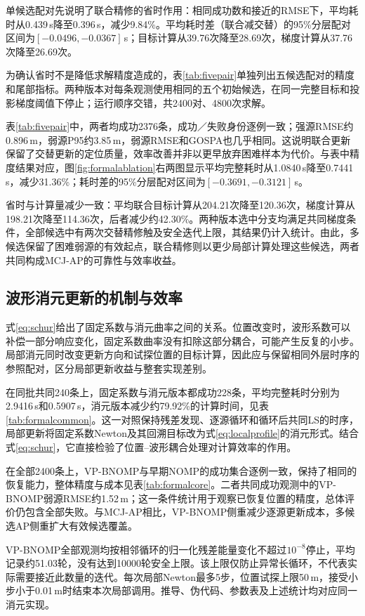 单候选配对先说明了联合精修的省时作用：相同成功数和接近的RMSE下，平均耗时从0.439\,s降至0.396\,s，减少9.84\%。平均耗时差（联合减交替）的95\%分层配对区间为$[-0.0496,-0.0367]$\,s；目标计算从39.76次降至28.69次，梯度计算从37.76次降至26.69次。

为确认省时不是降低求解精度造成的，表\ref{tab:fivepair}单独列出五候选配对的精度和尾部指标。两种版本对每条观测使用相同的五个初始候选，在同一完整目标和投影梯度阈值下停止；运行顺序交错，共2400对、4800次求解。

表\ref{tab:fivepair}中，两者均成功2376条，成功／失败身份逐例一致；强源RMSE约0.896\,m，弱源P95约3.85\,m，弱源RMSE和GOSPA也几乎相同。这说明联合更新保留了交替更新的定位质量，效率改善并非以更早放弃困难样本为代价。与表中精度结果对应，图\ref{fig:formalablation}右两图显示平均完整耗时从1.0840\,s降至0.7441\,s，减少31.36\%；耗时差的95\%分层配对区间为$[-0.3691,-0.3121]$\,s。

省时与计算量减少一致：平均联合目标计算从204.21次降至120.36次，梯度计算从198.21次降至114.36次，后者减少约42.30\%。两种版本选中分支均满足共同梯度条件，全部候选中有两次交替精修触及安全迭代上限，其结果仍计入统计。由此，多候选保留了困难弱源的有效起点，联合精修则以更少局部计算处理这些候选，两者共同构成MCJ-AP的可靠性与效率收益。

\FloatBarrier
\subsection{波形消元更新的机制与效率}\label{sec:mechanismresults}
式\eqref{eq:schur}给出了固定系数与消元曲率之间的关系。位置改变时，波形系数可以补偿一部分响应变化，固定系数曲率没有扣除这部分耦合，可能产生反复的小步。局部消元同时改变更新方向和试探位置的目标计算，因此应与保留相同外层时序的参照配对，区分局部更新收益与整套实现差别。

在同批共同240条上，固定系数与消元版本都成功228条，平均完整耗时分别为2.9416\,s和0.5907\,s，消元版本减少约79.92\%的计算时间，见表\ref{tab:formalcommon}。这一对照保持残差发现、逐源循环和循环后共同LS的时序，局部更新将固定系数Newton及其回溯目标改为式\eqref{eq:localprofile}的消元形式。结合式\eqref{eq:schur}，它直接检验了位置--波形耦合处理对计算效率的作用。

在全部2400条上，VP-BNOMP与早期NOMP的成功集合逐例一致，保持了相同的恢复能力，整体精度与成本见表\ref{tab:formalcore}。二者共同成功观测中的VP-BNOMP弱源RMSE约1.52\,m；这一条件统计用于观察已恢复位置的精度，总体评价仍包含全部失败。与MCJ-AP相比，VP-BNOMP侧重减少逐源更新成本，多候选AP侧重扩大有效候选覆盖。

VP-BNOMP全部观测均按相邻循环的归一化残差能量变化不超过$10^{-8}$停止，平均记录约51.03轮，没有达到10000轮安全上限。该上限仅防止异常长循环，不代表实际需要接近此数量的迭代。每次局部Newton最多5步，位置试探上限50\,m，接受小步小于0.01\,m时结束本次局部调用。推导、伪代码、参数表及上述统计均对应同一消元实现。


